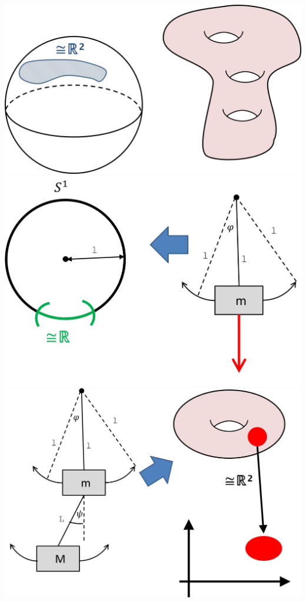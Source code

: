 \documentclass[a4paper,11pt,notitlepage]{report}
\theoremstyle{remark}
\theoremstyle{definition}
\begin{document}
\includegraphics[scale=0.3]{images/Mannigfaltigkeiten1.jpg} \newline \newline
\includegraphics[scale=0.4]{images/S1_Pendel.jpg} \newline \newline
\includegraphics[scale=0.4]{images/Torus_Doppelpendel.jpg} \newline \newline
\end{document}
